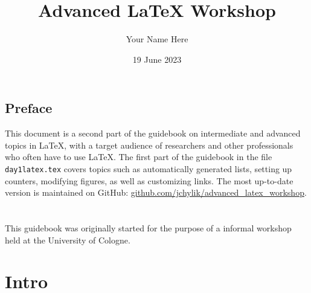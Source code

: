 \documentclass[a4paper,10pt]{report} %
\title{Advanced LaTeX Workshop}
\author{Your Name Here}
\date{19 June 2023}
\begin{document}
 \thispagestyle{plain} 
 \setcounter{page}{1}
 \section*{Preface} 
 
 This document is a second part of the guidebook on intermediate and advanced topics in \LaTeX, with a target audience of researchers and other professionals who often have to use \LaTeX.
 The first part of the guidebook in the file \texttt{day1latex.tex} covers topics such as automatically generated lists, setting up counters, modifying figures, as well as customizing links.
 The most up-to-date version is maintained on GitHub: \href{https://github.com/jchylik/advanced_latex_workshop}{github.com/jchylik/advanced\_latex\_workshop}. \ \\\\
 
 
 This guidebook was originally started for the purpose of a informal workshop held at the University of Cologne. 
%
%

\maketitle
 
\chapter{Intro} \label{chap:intro}

\setcounter{page}{3} 
\end{document}
